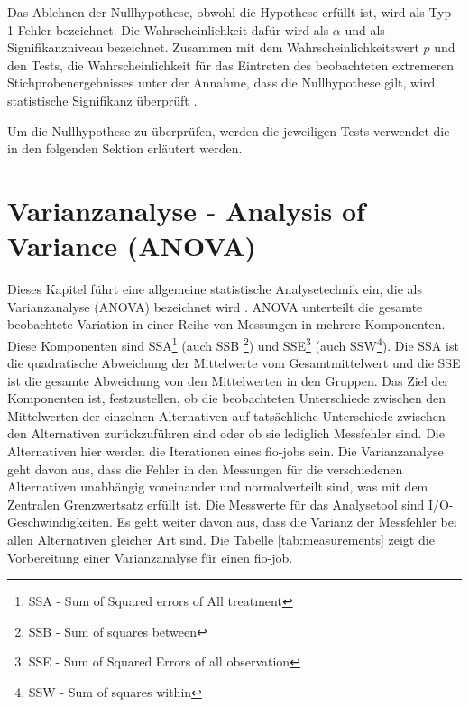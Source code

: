 Das Ablehnen der Nullhypothese, obwohl die Hypothese erfüllt ist, wird als Typ-1-Fehler bezeichnet.
Die Wahrscheinlichkeit dafür wird als $\alpha$ und als Signifikanzniveau bezeichnet. Zusammen mit dem Wahrscheinlichkeitswert $p$ und den Tests, 
 die Wahrscheinlichkeit für das Eintreten des beobachteten 
extremeren Stichprobenergebnisses unter der Annahme, dass die Nullhypothese gilt, wird statistische Signifikanz überprüft \cite{kurt2020stochastik}.


Um die Nullhypothese zu überprüfen, werden die jeweiligen Tests verwendet die in den folgenden Sektion erläutert werden. 

\section{Varianzanalyse - Analysis of Variance (ANOVA)}
 
Dieses Kapitel führt eine allgemeine statistische Analysetechnik ein, die als Varianzanalyse (ANOVA) bezeichnet wird \cite{Lilja_2000}. 
ANOVA unterteilt die gesamte beobachtete Variation in einer Reihe von Messungen in mehrere Komponenten.
Diese Komponenten sind SSA\footnote{SSA - Sum of Squared errors of All treatment} (auch SSB \footnote{SSB - Sum of squares between}) und SSE\footnote{SSE - Sum of Squared Errors of all observation}
 (auch SSW\footnote{SSW - Sum of squares within}).
Die SSA  ist die quadratische Abweichung der Mittelwerte vom Gesamtmittelwert und die SSE
ist die gesamte Abweichung von den Mittelwerten in den Gruppen.
Das Ziel der Komponenten ist, festzustellen, ob die beobachteten Unterschiede zwischen den Mittelwerten der einzelnen Alternativen auf tatsächliche 
Unterschiede zwischen den Alternativen zurückzuführen sind oder ob sie lediglich Messfehler sind.
Die Alternativen hier werden die Iterationen eines fio-jobs sein.
Die Varianzanalyse geht davon aus, dass die Fehler in den Messungen für die verschiedenen Alternativen
unabhängig voneinander und normalverteilt sind, was mit dem Zentralen Grenzwertsatz erfüllt ist.
Die Messwerte für das Analysetool sind I/O-Geschwindigkeiten.
Es geht weiter davon aus, dass die Varianz der Messfehler bei allen Alternativen gleicher Art sind.
Die Tabelle \ref{tab:measurements} zeigt die Vorbereitung einer Varianzanalyse für einen fio-job.

